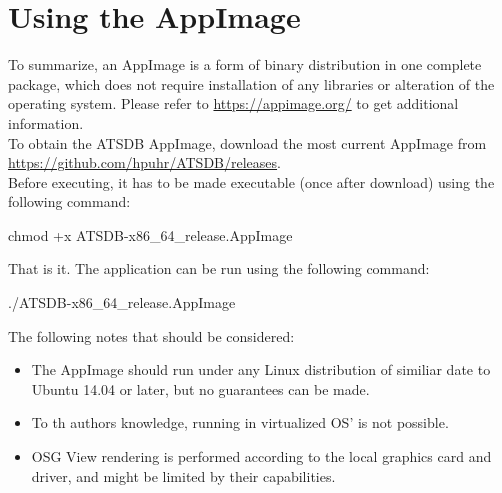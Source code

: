 \section{Using the AppImage}

To summarize, an AppImage is a form of binary distribution in one complete package, which does not require installation of any libraries or alteration of the operating system. Please refer to \url{https://appimage.org/} to get additional information. \\

To obtain the ATSDB AppImage, download the most current AppImage from \url{https://github.com/hpuhr/ATSDB/releases}. \\

Before executing, it has to be made executable (once after download) using the following command:
\begin{cverbatim}
chmod +x ATSDB-x86_64_release.AppImage
\end{cverbatim}

That is it. The application can be run using the following command:
\begin{cverbatim}
./ATSDB-x86_64_release.AppImage
\end{cverbatim}

The following notes that should be considered:

\begin{itemize}  
\item The AppImage should run under any Linux distribution of similiar date to Ubuntu 14.04 or later, but no guarantees can be made.
\item To th authors knowledge, running in virtualized OS' is not possible.
\item OSG View rendering is performed according to the local graphics card and driver, and might be limited by their capabilities.
\end{itemize} 
